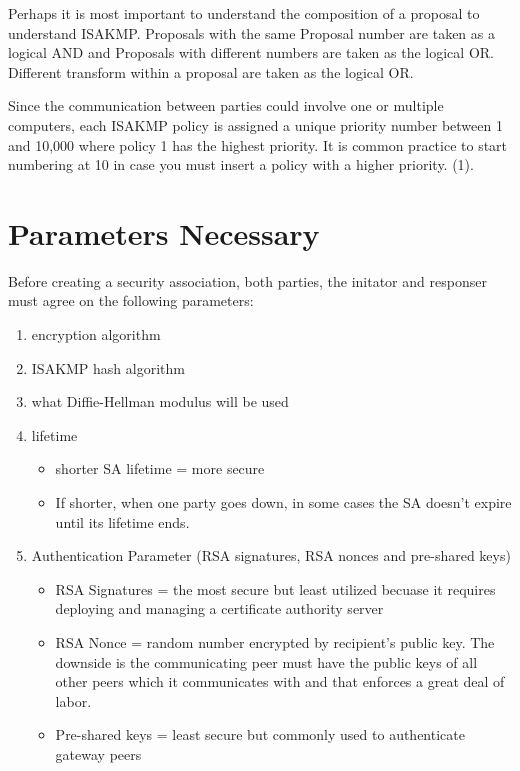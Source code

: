 \documentclass{report}
\newcommand{\squash}{\itemsep=0pt\parskip=0pt}
\begin{document}
\begin{itemize}
Perhaps it is most important to understand the composition of a proposal to understand ISAKMP. Proposals with the same Proposal number are taken as a logical AND and Proposals with different numbers are taken as the logical OR. Different transform within a proposal are taken as the logical OR.

Since the communication between parties could involve one or multiple computers, each ISAKMP policy is assigned a unique priority number between 1 and 10,000 where policy 1 has the highest priority. It is common practice to start numbering at 10 in case you must insert a policy with a higher priority. (1).

\section {Parameters Necessary}

Before creating a security association, both parties, the initator and responser must agree on the following parameters:

\begin{enumerate}
  \squash
\item encryption algorithm
\item ISAKMP hash algorithm
\item what Diffie-Hellman modulus will be used
\item lifetime
  \begin{itemize}
  \item shorter SA lifetime = more secure
  \item If shorter, when one party goes down, in some cases the SA doesn't expire until its lifetime ends.
  \end{itemize}
\item Authentication Parameter (RSA signatures, RSA nonces and pre-shared keys)
  \begin{itemize}
  \item RSA Signatures = the most secure but least utilized becuase it requires deploying and managing a certificate authority server
  \item RSA Nonce = random number encrypted by recipient's public key. The downside is the communicating peer must have the public keys of all other peers which it communicates with and that enforces a great deal of labor.
    \item Pre-shared keys = least secure but commonly used to authenticate gateway peers
  \end{itemize}
\end{enumerate}



\end{itemize}
\end{document}
